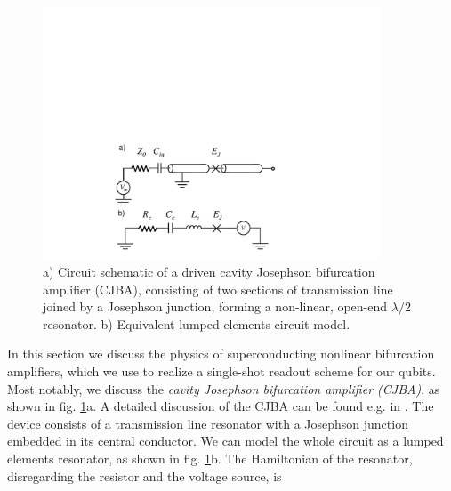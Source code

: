 \begin{figure}
	\includegraphics[width=10cm]{"./material/figures/introduction/jba"}
	\caption{a) Circuit schematic of a driven cavity Josephson bifurcation amplifier (CJBA), consisting of two sections of transmission line joined by a Josephson junction, forming a  non-linear, open-end $\lambda/2$ resonator. b) Equivalent lumped elements circuit model.}
	\label{fig:cba_schematic}
\end{figure}

In this section we discuss the physics of superconducting nonlinear bifurcation amplifiers, which we use to realize a single-shot readout scheme for our qubits. Most notably, we discuss the {\it cavity Josephson bifurcation amplifier (CJBA)}, as shown in fig. \ref{fig:cba_schematic}a. A detailed discussion of the CJBA can be found e.g. in \cite{palacios-laloy_superconducting_2010}. The device consists of a transmission line resonator with a Josephson junction embedded in its central conductor. We can model the whole circuit as a lumped elements resonator, as shown in fig. \ref{fig:cba_schematic}b. The Hamiltonian of the resonator, disregarding the resistor and the voltage source, is

